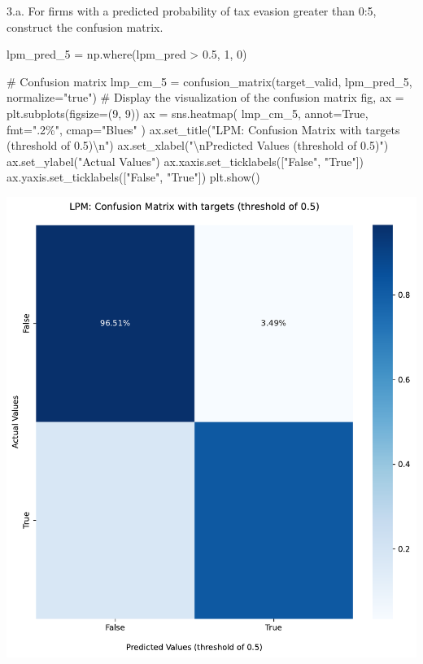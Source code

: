 \documentclass[
  11pt,
  letterpaper,
  DIV=11,
  numbers=noendperiod]{scrartcl}
\newenvironment{Shaded}{\begin{snugshade}}{\end{snugshade}}
\newcommand{\CharTok}[1]{\textcolor[rgb]{0.13,0.47,0.30}{#1}}
\newcommand{\CommentTok}[1]{\textcolor[rgb]{0.37,0.37,0.37}{#1}}
\newcommand{\DecValTok}[1]{\textcolor[rgb]{0.68,0.00,0.00}{#1}}
\newcommand{\FloatTok}[1]{\textcolor[rgb]{0.68,0.00,0.00}{#1}}
\newcommand{\NormalTok}[1]{\textcolor[rgb]{0.00,0.23,0.31}{#1}}
\newcommand{\OperatorTok}[1]{\textcolor[rgb]{0.37,0.37,0.37}{#1}}
\newcommand{\StringTok}[1]{\textcolor[rgb]{0.13,0.47,0.30}{#1}}
\newcommand{\VariableTok}[1]{\textcolor[rgb]{0.07,0.07,0.07}{#1}}
\begin{document}
3.a. For firms with a predicted probability of tax evasion greater than
0:5, construct the confusion matrix.

\begin{Shaded}
\begin{Highlighting}[]
\NormalTok{lpm\_pred\_5 }\OperatorTok{=}\NormalTok{ np.where(lpm\_pred }\OperatorTok{\textgreater{}} \FloatTok{0.5}\NormalTok{, }\DecValTok{1}\NormalTok{, }\DecValTok{0}\NormalTok{)}

\CommentTok{\# Confusion matrix}
\NormalTok{lmp\_cm\_5 }\OperatorTok{=}\NormalTok{ confusion\_matrix(target\_valid, lpm\_pred\_5, normalize}\OperatorTok{=}\StringTok{"true"}\NormalTok{)}
\CommentTok{\# Display the visualization of the confusion matrix}
\NormalTok{fig, ax }\OperatorTok{=}\NormalTok{ plt.subplots(figsize}\OperatorTok{=}\NormalTok{(}\DecValTok{9}\NormalTok{, }\DecValTok{9}\NormalTok{))}
\NormalTok{ax }\OperatorTok{=}\NormalTok{ sns.heatmap(}
\NormalTok{lmp\_cm\_5, annot}\OperatorTok{=}\VariableTok{True}\NormalTok{, fmt}\OperatorTok{=}\StringTok{".2\%"}\NormalTok{, cmap}\OperatorTok{=}\StringTok{"Blues"}
\NormalTok{)}
\NormalTok{ax.set\_title(}\StringTok{"LPM: Confusion Matrix with targets (threshold of 0.5)}\CharTok{\textbackslash{}n}\StringTok{"}\NormalTok{)}
\NormalTok{ax.set\_xlabel(}\StringTok{"}\CharTok{\textbackslash{}n}\StringTok{Predicted Values (threshold of 0.5)"}\NormalTok{)}
\NormalTok{ax.set\_ylabel(}\StringTok{"Actual Values"}\NormalTok{)}
\NormalTok{ax.xaxis.set\_ticklabels([}\StringTok{"False"}\NormalTok{, }\StringTok{"True"}\NormalTok{])}
\NormalTok{ax.yaxis.set\_ticklabels([}\StringTok{"False"}\NormalTok{, }\StringTok{"True"}\NormalTok{])}
\NormalTok{plt.show()}
\end{Highlighting}
\end{Shaded}

\includegraphics{mp2_files/figure-pdf/cell-7-output-1.pdf}
\end{document}
